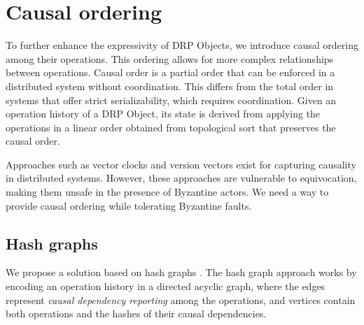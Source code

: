 \documentclass{article}
\begin{document}
\section{Causal ordering}
\label{sec:headings}

To further enhance the expressivity of DRP Objects, we introduce causal ordering among their operations. This ordering allows for more complex relationships between operations. Causal order is a partial order that can be enforced in a distributed system without coordination. This differs from the total order in systems that offer strict serializability, which requires coordination. Given an operation history of a DRP Object, its state is derived from applying the operations in a linear order obtained from topological sort that preserves the causal order.

Approaches such as vector clocks and version vectors exist for capturing causality in distributed systems. However, these approaches are vulnerable to equivocation, making them unsafe in the presence of Byzantine actors. We need a way to provide causal ordering while tolerating Byzantine faults.

\subsection{Hash graphs}

We propose a solution based on hash graphs \cite{BEC, BFT-CRDT, Merkle-CRDTs, Blocklace}. The hash graph approach works by encoding an operation history in a directed acyclic graph, where the edges represent \textit{causal dependency reporting} among the operations, and vertices contain both operations and the hashes of their causal dependencies.
\end{document}
